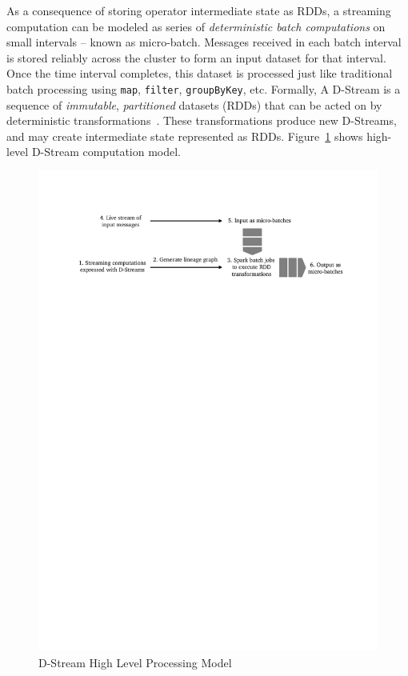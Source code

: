 As a consequence of storing operator intermediate state as RDDs, a streaming computation can be modeled as series of \emph{deterministic batch computations} on small intervals -- known as micro-batch. Messages received in each batch interval is stored reliably across the cluster to form an input dataset for that interval. Once the time interval completes, this dataset is processed just like traditional batch processing using \lstinline$map$, \lstinline$filter$, \lstinline$groupByKey$, etc. Formally, A D-Stream is a sequence of \emph{immutable}, \emph{partitioned} datasets (RDDs) that can be acted on by deterministic transformations~\cite{Zaharia:2013}. These  transformations produce new D-Streams, and may create intermediate state represented as RDDs. Figure~\ref{fig:sp:dstream-high} shows high-level D-Stream computation model.
\begin{figure}[hb]
    \centering
    \includegraphics[clip,trim=2.1cm 23cm 2cm 2.6cm]{dstream-high.pdf}
    \caption{D-Stream High Level Processing Model}
    \label{fig:sp:dstream-high}
\end{figure}

